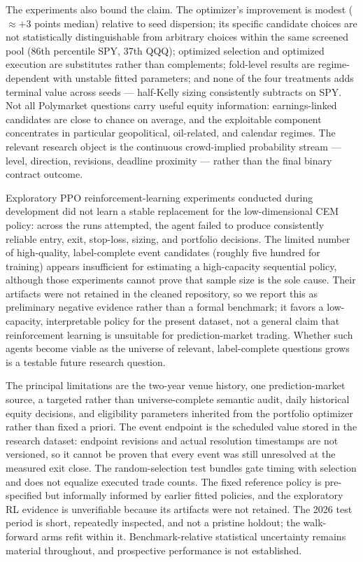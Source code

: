 \documentclass[sigconf,anonymous]{acmart}
\begin{document}
The experiments also bound the claim. The optimizer's improvement is modest ($\approx+3$ points median) relative to seed dispersion; its specific candidate choices are not statistically distinguishable from arbitrary choices within the same screened pool (86th percentile SPY, 37th QQQ); optimized selection and optimized execution are substitutes rather than complements; fold-level results are regime-dependent with unstable fitted parameters; and none of the four treatments adds terminal value across seeds --- half-Kelly sizing consistently subtracts on SPY. Not all Polymarket questions carry useful equity information: earnings-linked candidates are close to chance on average, and the exploitable component concentrates in particular geopolitical, oil-related, and calendar regimes. The relevant research object is the continuous crowd-implied probability stream --- level, direction, revisions, deadline proximity --- rather than the final binary contract outcome.

Exploratory PPO reinforcement-learning experiments conducted during development did not learn a stable replacement for the low-dimensional CEM policy: across the runs attempted, the agent failed to produce consistently reliable entry, exit, stop-loss, sizing, and portfolio decisions. The limited number of high-quality, label-complete event candidates (roughly five hundred for training) appears insufficient for estimating a high-capacity sequential policy, although those experiments cannot prove that sample size is the sole cause. Their artifacts were not retained in the cleaned repository, so we report this as preliminary negative evidence rather than a formal benchmark; it favors a low-capacity, interpretable policy for the present dataset, not a general claim that reinforcement learning is unsuitable for prediction-market trading. Whether such agents become viable as the universe of relevant, label-complete questions grows is a testable future research question.

The principal limitations are the two-year venue history, one prediction-market source, a targeted rather than universe-complete semantic audit, daily historical equity decisions, and eligibility parameters inherited from the portfolio optimizer rather than fixed a priori. The event endpoint is the scheduled value stored in the research dataset: endpoint revisions and actual resolution timestamps are not versioned, so it cannot be proven that every event was still unresolved at the measured exit close. The random-selection test bundles gate timing with selection and does not equalize executed trade counts. The fixed reference policy is pre-specified but informally informed by earlier fitted policies, and the exploratory RL evidence is unverifiable because its artifacts were not retained. The 2026 test period is short, repeatedly inspected, and not a pristine holdout; the walk-forward arms refit within it. Benchmark-relative statistical uncertainty remains material throughout, and prospective performance is not established.
\end{document}
